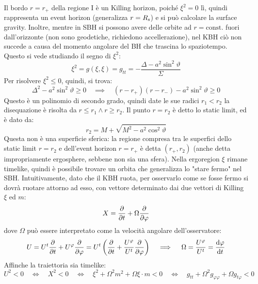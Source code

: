 Il bordo $ r = r_+ $ della regione I è un Killing horizon, poiché $ \xi^2 = 0 $ lì, quindi rappresenta un event horizon (generalizza $ r = R_\text{s} $) e si può calcolare la surface gravity. Inoltre, mentre in SBH si possono avere delle orbite ad $ r = \text{const.} $ fuori dall'orizzonte (non sono geodetiche, richiedono accellerazione), nel KBH ciò non succede a causa del momento angolare del BH che trascina lo spaziotempo. Questo si vede studiando il segno di $ \xi^2 $:
\begin{equation*}
  \xi^2 = g(\xi , \xi) = g_{tt} = - \frac{\Delta - a^2 \sin^2 \vartheta}{\Sigma}
\end{equation*}
Per risolvere $ \xi^2 \leq 0 $, quindi, si trova:
\begin{equation*}
  \Delta^2 - a^2 \sin^2 \vartheta \geq 0
  \quad \implies \quad
  (r - r_+) (r - r_-) - a^2 \sin^2 \vartheta \geq 0
\end{equation*}
Questo è un polinomio di secondo grado, quindi date le sue radici $ r_1 < r_2 $ la disequazione è risolta da $ r \leq r_1 \land r \geq r_2 $. Il punto $ r = r_2 $ è detto lo static limit, ed è dato da:
\begin{equation*}
  r_2 = M + \sqrt{M^2 - a^2 \cos^2 \vartheta}
\end{equation*}
Questa non è una superficie sferica: la regione compresa tra le superfici dello static limit $ r = r_2 $ e dell'event horizon $ r = r_+ $ è detta  $ (r_+ , r_2) $ (anche detta impropriamente ergosphere, sebbene non sia una sfera). Nella ergoregion $ \xi $ rimane timelike, quindi è possibile trovare un orbita che generalizza lo "stare fermo" nel SBH. Intuitivamente, dato che il KBH ruota, per osservarlo come se fosse fermo si dovrà ruotare attorno ad esso, con vettore determinato dai due vettori di Killing $ \xi $ ed $ m $:
\begin{equation}
  X = \frac{\partial}{\partial t} + \Omega \frac{\partial}{\partial \varphi}
\end{equation}
dove $ \Omega $ può essere interpretato come la velocità angolare dell'osservatore:
\begin{equation*}
  U = U^t \frac{\partial}{\partial t} + U^\varphi \frac{\partial}{\partial \varphi} = U^t \left( \frac{\partial}{\partial t} + \frac{U^\varphi}{U^t} \frac{\partial}{\partial \varphi} \right)
  \quad \implies \quad
  \Omega = \frac{U^\varphi}{U^t} = \frac{\mathrm{d} \varphi}{\mathrm{d} t}
\end{equation*}
Affinche la traiettoria sia timelike:
\begin{equation*}
  U^2 < 0
  \quad \iff \quad
  X^2 < 0
  \quad \iff \quad
  \xi^2 + \Omega^2 m^2 + \Omega \xi \cdot m < 0
  \quad \iff \quad
  g_{tt} + \Omega^2 g_{\varphi \varphi} + \Omega g_{t \varphi} < 0
\end{equation*}

